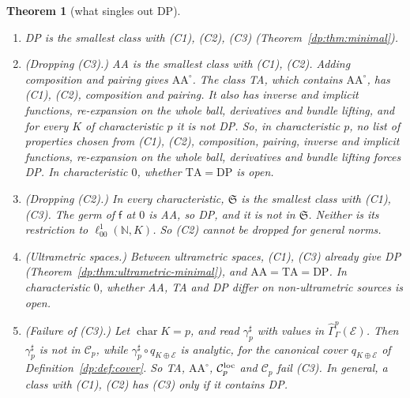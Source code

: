 \documentclass[11pt]{amsart}
\newtheorem{theorem}{Theorem}[section]
\theoremstyle{definition}
\theoremstyle{remark}
\numberwithin{equation}{section}
\newcommand{\N}{\mathbb N}
\newcommand{\cC}{\mathcal{C}}
\theoremstyle{plain}
\theoremstyle{definition}
\theoremstyle{plain}
\newcommand{\hGamma}{\widehat\Gamma}
\begin{document}
\begin{theorem}[what singles out DP]\label{dp:thm:singles-out}
\leavevmode
\begin{enumerate}
\item DP is the smallest class with \textup{(C1), (C2), (C3)} (Theorem~\ref{dp:thm:minimal}).
\item \textup{(Dropping (C3).)} AA is the smallest class with \textup{(C1), (C2)}. Adding composition and pairing gives $\mathrm{AA}^\circ$. The class TA, which contains $\mathrm{AA}^\circ$, has \textup{(C1), (C2)}, composition and pairing. It also has inverse and implicit functions, re-expansion on the whole ball, derivatives and bundle lifting, and for every $K$ of characteristic $p$ it is not DP. So, in characteristic $p$, no list of properties chosen from \textup{(C1), (C2)}, composition, pairing, inverse and implicit functions, re-expansion on the whole ball, derivatives and bundle lifting forces DP. In characteristic $0$, whether $\mathrm{TA}=\mathrm{DP}$ is open.
\item \textup{(Dropping (C2).)} In every characteristic, $\mathfrak S$ is the smallest class with \textup{(C1), (C3)}. The germ of $\mathsf f$ at $0$ is AA, so DP, and it is not in $\mathfrak S$. Neither is its restriction to $\ell^1_{00}(\N,K)$. So \textup{(C2)} cannot be dropped for general norms.
\item \textup{(Ultrametric spaces.)} Between ultrametric spaces, \textup{(C1), (C3)} already give DP (Theorem~\ref{dp:thm:ultrametric-minimal}), and $\mathrm{AA}=\mathrm{TA}=\mathrm{DP}$. In characteristic $0$, whether AA, TA and DP differ on non-ultrametric sources is open.
\item \textup{(Failure of (C3).)} Let $\operatorname{char}K=p$, and read $\gamma^\sharp_p$ with values in $\hGamma^p_\Gamma(\mathcal E)$. Then $\gamma^\sharp_p$ is not in $\cC_p$, while $\gamma^\sharp_p\circ q_{K\oplus\mathcal E}$ is analytic, for the canonical cover $q_{K\oplus\mathcal E}$ of Definition~\ref{dp:def:cover}. So TA, $\mathrm{AA}^\circ$, $\cC_p^{\rm loc}$ and $\cC_p$ fail \textup{(C3)}. In general, a class with \textup{(C1), (C2)} has \textup{(C3)} only if it contains DP.
\end{enumerate}
\end{theorem}
\end{document}
